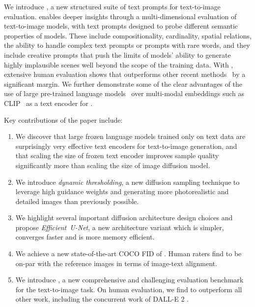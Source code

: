 We introduce \benchmarkname, a new structured suite of text prompts for text-to-image evaluation. 
\benchmarkname enables deeper insights through a multi-dimensional evaluation of  text-to-image
models, with text prompts designed to probe different semantic properties of models.  These include compositionality, cardinality, spatial relations, the ability to handle complex text prompts or prompts with rare words, and they include creative prompts that push the limits of models' ability to generate highly implausible scenes well beyond the scope of the training data.
With \benchmarkname, extensive human evaluation shows that \name outperforms other recent methods~\cite{rombach-cvpr-2022, crowson2022vqgan, ramesh-dalle2} by a significant margin. 
We further demonstrate some of the clear advantages of the use of large pre-trained language models~\cite{raffel-jmlr-2020} over multi-modal embeddings such as CLIP~\cite{radford-icml-2021} as a text encoder for \name.


Key contributions of the paper include:
\begin{enumerate}[noitemsep,nolistsep,leftmargin=0.5cm]
    \item We discover that large frozen language models trained only on text data are surprisingly very effective text encoders for text-to-image generation, and that scaling the size of frozen text encoder improves sample quality significantly more than scaling the size of image diffusion model.
    \item We introduce \emph{dynamic thresholding}, a %
    new diffusion sampling technique to leverage high guidance weights and generating more photorealistic and detailed images than previously possible.
    \item We highlight several important diffusion architecture design choices and propose \mbox{\emph{Efficient U-Net}}, a new architecture variant which is simpler, converges faster and is more memory efficient. 
    \item We achieve a new state-of-the-art COCO FID of \ourmscocofid. Human raters find \name to be on-par with the reference images in terms of image-text alignment. 
    \item We introduce \benchmarkname, a new comprehensive and challenging evaluation benchmark for the text-to-image task. On \benchmarkname human evaluation, we find \name to outperform all other work, including the concurrent work of DALL-E 2 \cite{ramesh-dalle2}.
\end{enumerate}
